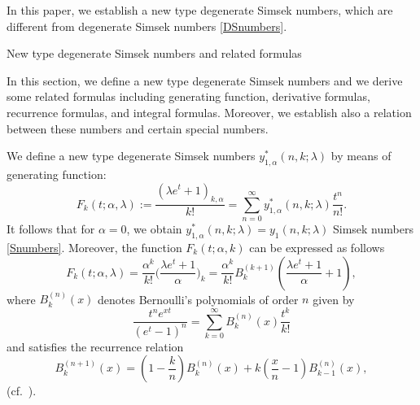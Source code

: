 \documentclass{amsart}
\numberwithin{equation}{section}
\theoremstyle{definition}
\theoremstyle{remark}
\begin{document}
In this paper, we establish a new type degenerate Simsek numbers, which are different from degenerate Simsek numbers \eqref{DSnumbers}.
\begin{section}
{New type degenerate Simsek numbers and related formulas}
\end{section}
In this section, we define a new type degenerate Simsek numbers and we derive some related formulas including generating function, derivative formulas, recurrence formulas, and integral formulas. Moreover, we establish also a relation between these numbers and certain special numbers.

We define a new type degenerate Simsek numbers $y^{*}_{1,\alpha}(n,k;\lambda)$ by means of generating function: 
 \begin{equation}\label{newgSn}
F_{k}(t; \alpha, \lambda):=\frac{(\lambda e^t+1)_{k,\alpha}}{k!}=\sum_{n=0}^{\infty}y_{1,\alpha}^{*}(n,k;\lambda)\frac{t^n}{n!}.  
 \end{equation}
It follows that for $\alpha=0$, we obtain $y_{1, \alpha}^{*}(n,k;\lambda)=y_{1}(n,k;\lambda)$ Simsek numbers \eqref{Snumbers}.  Moreover, the function $F_{k}(t;\alpha,k)$ can be expressed as follows 
\begin{equation}\label{BerPoly}
F_{k}(t;\alpha,\lambda)=\frac{\alpha^k}{k!}\bigg(\frac{\lambda e^t+1}{\alpha}\bigg)_{k}=\frac{\alpha^k}{k!}B_{k}^{(k+1)}\left(\frac{\lambda e^t+1}{\alpha}+1\right),
\end{equation}
where $B_{k}^{(n)}(x)$ denotes Bernoulli's polynomials of order $n$ given by 
\begin{equation}
\frac{t^ne^{xt}}{(e^t-1)^n}=\sum_{k=0}^{\infty}B_{k}^{(n)}(x)\frac{t^k}{k!}
\end{equation}
and satisfies the recurrence relation
\begin{equation}\label{BerPolyrec}
B_{k}^{(n+1)}(x)=\left(1-\frac{k}{n}\right)B_{k}^{(n)}(x)+k\left(\frac{x}{n}-1\right)B_{k-1}^{(n)}(x),
\end{equation}
(cf.~\cite{LLM1980}).
\end{document}
